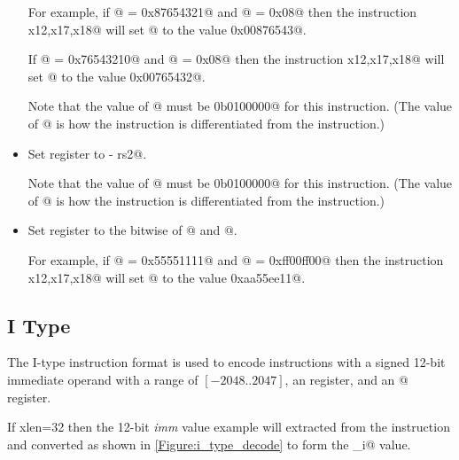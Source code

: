 \begin{itemize}
For example, if @ = \verb@0x87654321@ and @ = \verb@0x08@
then the instruction \verb@srl x12,x17,x18@ will set @ to the
value \verb@0x00876543@.

If @ = \verb@0x76543210@ and @ = \verb@0x08@
then the instruction \verb@srl x12,x17,x18@ will set @ to the
value \verb@0x00765432@.

Note that the value of @ must be \verb@0b0100000@ for this instruction.
(The value of @ is how the \verb@srl@ instruction is differentiated 
from the \verb@sra@ instruction.)

\item{}
\label{insn:sub}

Set register \verb@rd@ to  - rs2@.

Note that the value of @ must be \verb@0b0100000@ for this instruction.
(The value of @ is how the \verb@sub@ instruction is differentiated 
from the \verb@add@ instruction.)

\item{}
\label{insn:xor}

Set register \verb@rd@ to the bitwise \verb@xor@ of @ and  @.

For example, if @ = \verb@0x55551111@ and @ = \verb@0xff00ff00@
then the instruction \verb@xor x12,x17,x18@ will set @ to the
value \verb@0xaa55ee11@.

\end{itemize}



\subsection{I Type}
\label{insnformat:itype}

The I-type instruction format is used to encode instructions with a
signed 12-bit immediate operand with a range of $[-2048..2047]$,
an \verb@rd@ register, and an @ register.

If \Gls{xlen}=32 then the 12-bit {\em imm} value example will extracted from 
the instruction and converted as shown in \autoref{Figure:i_type_decode}
to form the \verb@imm_i@ value.

\begin{figure}[ht]
\centering
\DrawInsnOpITypeDecoding
{}
\label{Figure:i_type_decode}
\label{imm.i:decode}
\end{figure}


